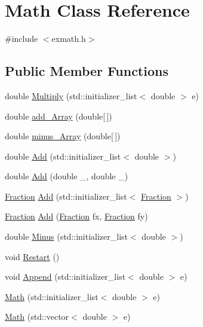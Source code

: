 \hypertarget{class_math}{}\section{Math Class Reference}
\label{class_math}


{\ttfamily \#include $<$exmath.\+h$>$}

\subsection*{Public Member Functions}
\begin{DoxyCompactItemize}
\item 
double \hyperlink{class_math_a26a8293c341693df720a43b62eec9a1f}{Multiply} (std\+::initializer\+\_\+list$<$ double $>$ e)
\item 
double \hyperlink{class_math_a6e848dd6549ea4e82a67247397bb6609}{add\+\_\+\+Array} (double\mbox{[}$\,$\mbox{]})
\item 
double \hyperlink{class_math_a7b4590fdebc2c7575a70100faf8f8cd5}{minus\+\_\+\+Array} (double\mbox{[}$\,$\mbox{]})
\item 
double \hyperlink{class_math_afb8af88c56e755d8cbefde63bd6f45b6}{Add} (std\+::initializer\+\_\+list$<$ double $>$)
\item 
double \hyperlink{class_math_a86af699b25141b749364fcf510e1052a}{Add} (double \+\_, double \+\_)
\item 
\hyperlink{class_fraction}{Fraction} \hyperlink{class_math_a27a37351782fcbd9642ec02ca62487c4}{Add} (std\+::initializer\+\_\+list$<$ \hyperlink{class_fraction}{Fraction} $>$)
\item 
\hyperlink{class_fraction}{Fraction} \hyperlink{class_math_a8d3cf32314cb1f2424d8ab4bf52462e7}{Add} (\hyperlink{class_fraction}{Fraction} fx, \hyperlink{class_fraction}{Fraction} fy)
\item 
double \hyperlink{class_math_ae74134126ecd5a8f5af1dc099065c19a}{Minus} (std\+::initializer\+\_\+list$<$ double $>$)
\item 
void \hyperlink{class_math_a7050cdc0662d9877ce72599d08490ad4}{Restart} ()
\item 
void \hyperlink{class_math_a391bd898c7042b754d875857c633a67e}{Append} (std\+::initializer\+\_\+list$<$ double $>$ e)
\item 
\hyperlink{class_math_adc7c649d0396e0f9f1b670e36dc47afb}{Math} (std\+::initializer\+\_\+list$<$ double $>$ e)
\item 
\hyperlink{class_math_ae4cd8f95267d18f7ed39e12c75be9f60}{Math} (std\+::vector$<$ double $>$ e)

\end{DoxyCompactItemize}
